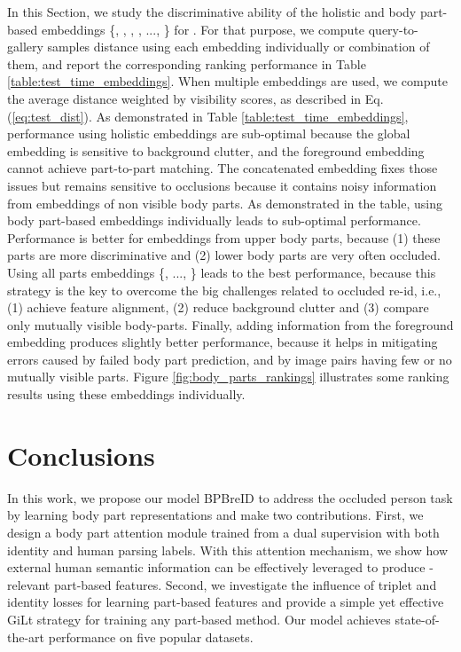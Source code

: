 \documentclass[10pt,twocolumn,letterpaper]{article}
\begin{document}
In this Section, we study the discriminative ability of the holistic and body part-based embeddings \{, , , , ..., \} for . For that purpose, we compute query-to-gallery samples distance using each embedding individually or combination of them, and report the corresponding ranking performance in Table \ref{table:test_time_embeddings}. 
When multiple embeddings are used, we compute the average distance weighted by visibility scores, as described in Eq. (\ref{eq:test_dist}).
As demonstrated in Table \ref{table:test_time_embeddings}, performance using holistic embeddings are sub-optimal because the global embedding is sensitive to background clutter, and the foreground embedding cannot achieve part-to-part matching.
The concatenated embedding fixes those issues but remains sensitive to occlusions because it contains noisy information from embeddings of non visible body parts.
As demonstrated in the table, using body part-based embeddings individually leads to sub-optimal performance.
Performance is better for embeddings from upper body parts, because (1) these parts are more discriminative and (2) lower body parts are very often occluded.
Using all parts embeddings \{, ..., \} leads to the best performance, because this strategy is the key to overcome the big challenges related to occluded re-id, i.e., (1) achieve feature alignment, (2) reduce background clutter and (3) compare only mutually visible body-parts.
Finally, adding information from the foreground embedding produces slightly better performance, because it helps in mitigating errors caused by failed body part prediction, and by image pairs having few or no mutually visible parts.
Figure \ref{fig:body_parts_rankings} illustrates some ranking results using these embeddings individually.











 
\section{Conclusions}
In this work, we propose our model BPBreID to address the occluded person {\reid} task by learning body part representations and make two contributions.
First, we design a body part attention module trained from a dual supervision with both identity and human parsing labels.
With this attention mechanism, we show how external human semantic information can be effectively leveraged to produce {\reid}-relevant part-based features.
Second, we investigate the influence of triplet and identity losses for learning part-based features and provide a simple yet effective GiLt strategy for training any part-based method.
Our model achieves state-of-the-art performance on five popular {\reid} datasets.
\end{document}

